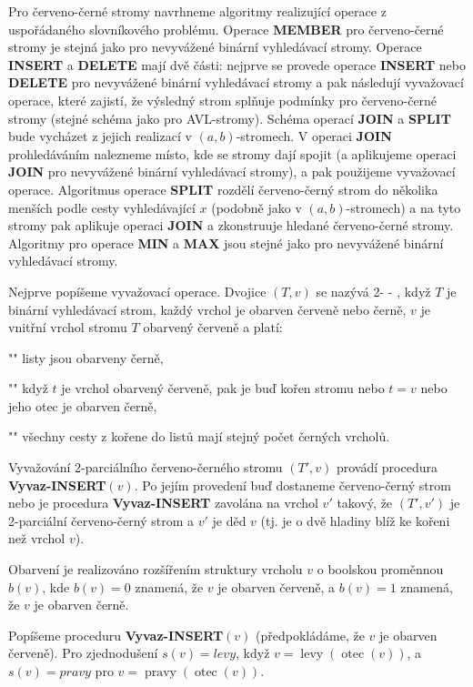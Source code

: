 \documentclass[a4paper,12pt]{article}
\def \emph#1{\underbar{#1}}
\DeclareMathOperator*{\otec}{otec}
\DeclareMathOperator*{\levy}{levy}
\DeclareMathOperator*{\pravy}{pravy}
\begin{document}
Pro červeno-černé stromy navrhneme algoritmy 
realizující ope\-race z uspořádaného slovní\-ko\-vého problému.  
Operace {\bf MEMBER} pro červeno-černé stromy je stejná jako pro 
nevyvážené binární vyhledávací stromy. Operace 
{\bf IN\-SERT} a {\bf DELETE} mají dvě části:  nejprve se provede 
ope\-race {\bf INSERT} nebo {\bf DELETE} pro nevyvážené binární 
vy\-hledávací stromy a pak následují vyvažovací operace, které 
zajistí, že výsledný strom splňuje pod\-mín\-ky pro červeno-černé 
stromy (stejné schéma jako pro AVL-stromy). Schéma operací 
{\bf JOIN} a {\bf SPLIT} bude vycházet z jejich realizací v $
(a,b)$-stromech. 
V operaci {\bf JOIN} prohledáváním nalezneme místo, kde se 
stromy  
dají spojit (a aplikujeme operaci {\bf JOIN} pro 
nevyvážené 
binární vyhledá\-va\-cí stromy), a pak použijeme 
vyvažovací operace. Algoritmus ope\-race {\bf SPLIT} rozdělí červeno-černý strom 
do několika menších podle cesty vyhledávající $
x$ (podobně jako 
v $(a,b)$-stromech) a na tyto stromy pak aplikuje operaci {\bf JOIN }
a zkonstruuje hledané červeno-černé stromy. Algoritmy pro 
ope\-race {\bf MIN} a {\bf MAX} jsou stejné jako pro nevyvážené binární 
vyhledávací stromy.

Nejprve popíšeme vyvažovací operace. 
Dvojice $(T,v)$ se nazývá 2-\emph{parciální}
\emph{červeno}-\emph{černý} \emph{strom}, když $T$ je 
binární vyhledávací strom, každý vrchol je obarven 
červeně nebo černě, $v$ je 
vnitřní vrchol stromu $T$ obarvený červeně a platí:
\roster
\item"{}"
listy jsou obarveny černě,
\item"{}"
když $t$ je vrchol obarvený červeně, pak je buď kořen 
stromu nebo $t=v$ nebo jeho otec je obarven černě,
\item"{}"
všechny cesty z kořene do listů mají stejný 
počet čer\-ných vrcholů.
\endroster

Vyvažování 2-parciálního červeno-černého stromu $(T',v)$ 
pro\-vá\-dí procedura {\bf Vyvaz-IN\-SERT$(v)$}.  Po jejím 
provedení buď do\-sta\-neme čer\-ve\-no-černý strom nebo 
je procedura {\bf Vyvaz-IN\-SERT} zavolána na vrchol $
v'$ takový, 
že $(T',v')$ je 2-parciální červe\-no-černý strom a $
v'$ je děd $v$ 
(tj.  je o dvě hladiny blíž ke kořeni než vrchol $
v$). 

Obarvení je realizováno rozšířením struktury vrcholu $v$ 
o boolskou proměnnou $b(v)$, kde $b(v)=0$ znamená, že $v$ je obarven 
červeně, a $b(v)=1$ znamená, že $v$ je obarven černě.

Popíšeme proceduru {\bf Vyvaz-INSERT$(v)$} (předpokládáme, že 
$v$ je obarven červeně). Pro zjednodušení $s(v
)=levy$, když $v=\levy(\otec(v))$, a $s(v)=pravy$ pro  
$v=\pravy(\otec(v))$.
\end{document}
